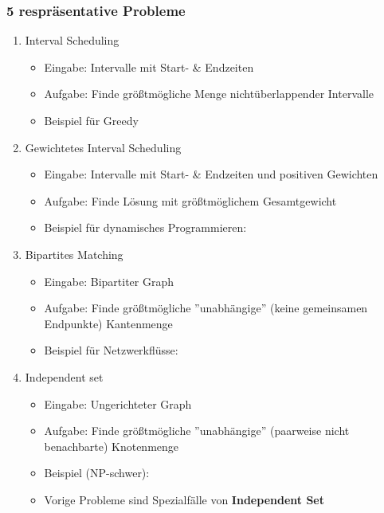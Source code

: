 \documentclass{scrartcl}
\begin{document}
\subsubsection{5 respräsentative Probleme}
\begin{enumerate}
	\item Interval Scheduling
	\begin{itemize}
		\item Eingabe: Intervalle mit Start- \& Endzeiten
		\item Aufgabe: Finde größtmögliche Menge nichtüberlappender Intervalle
		\item Beispiel für Greedy \\
		
	\end{itemize}
	\item Gewichtetes Interval Scheduling
	\begin{itemize}
		\item Eingabe: Intervalle mit Start- \& Endzeiten und positiven Gewichten
		\item Aufgabe: Finde Lösung mit größtmöglichem Gesamtgewicht
		\item Beispiel für dynamisches Programmieren: \\
		
	\end{itemize}
	\item Bipartites Matching
	\begin{itemize}
		\item Eingabe: Bipartiter Graph
		\item Aufgabe: Finde größtmögliche ''unabhängige'' (keine gemeinsamen Endpunkte) Kantenmenge
		\item Beispiel für Netzwerkflüsse: \\
		
	\end{itemize}
	\item Independent set
	\begin{itemize}
		\item Eingabe: Ungerichteter Graph
		\item Aufgabe: Finde größtmögliche ''unabhängige'' (paarweise nicht benachbarte) Knotenmenge
		\item Beispiel (NP-schwer): \\
		
		\item Vorige Probleme sind Spezialfälle von \textbf{Independent Set}
	\end{itemize}

\end{enumerate}
\end{document}

